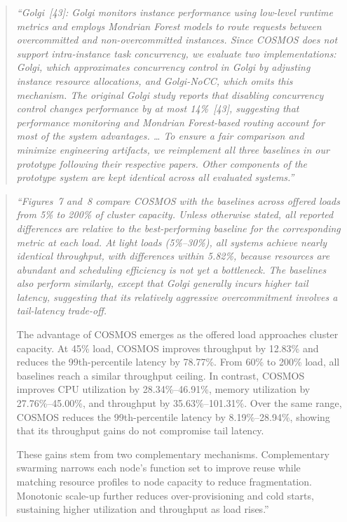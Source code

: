 \documentclass[11pt]{article}
\newenvironment{revisionquote}{\begin{quote}\itshape}{\end{quote}}
\begin{document}
\begin{revisionquote}
``Golgi~[43]: Golgi monitors instance performance using low-level runtime metrics and employs Mondrian Forest models to route requests between overcommitted and non-overcommitted instances. Since COSMOS does not support intra-instance task concurrency, we evaluate two implementations: Golgi, which approximates concurrency control in Golgi by adjusting instance resource allocations, and Golgi-NoCC, which omits this mechanism. The original Golgi study reports that disabling concurrency control changes performance by at most 14\%~[43], suggesting that performance monitoring and Mondrian Forest-based routing account for most of the system advantages. \ldots{} To ensure a fair comparison and minimize engineering artifacts, we reimplement all three baselines in our prototype following their respective papers. Other components of the prototype system are kept identical across all evaluated systems.''
\end{revisionquote}

\begin{revisionquote}
``Figures~7 and~8 compare COSMOS with the baselines across offered loads from 5\% to 200\% of cluster capacity. Unless otherwise stated, all reported differences are relative to the best-performing baseline for the corresponding metric at each load. At light loads (5\%--30\%), all systems achieve nearly identical throughput, with differences within 5.82\%, because resources are abundant and scheduling efficiency is not yet a bottleneck. The baselines also perform similarly, except that Golgi generally incurs higher tail latency, suggesting that its relatively aggressive overcommitment involves a tail-latency trade-off.

The advantage of COSMOS emerges as the offered load approaches cluster capacity. At 45\% load, COSMOS improves throughput by 12.83\% and reduces the 99th-percentile latency by 78.77\%. From 60\% to 200\% load, all baselines reach a similar throughput ceiling. In contrast, COSMOS improves CPU utilization by 28.34\%--46.91\%, memory utilization by 27.76\%--45.00\%, and throughput by 35.63\%--101.31\%. Over the same range, COSMOS reduces the 99th-percentile latency by 8.19\%--28.94\%, showing that its throughput gains do not compromise tail latency.

These gains stem from two complementary mechanisms. Complementary swarming narrows each node's function set to improve reuse while matching resource profiles to node capacity to reduce fragmentation. Monotonic scale-up further reduces over-provisioning and cold starts, sustaining higher utilization and throughput as load rises.''
\end{revisionquote}
\end{document}
